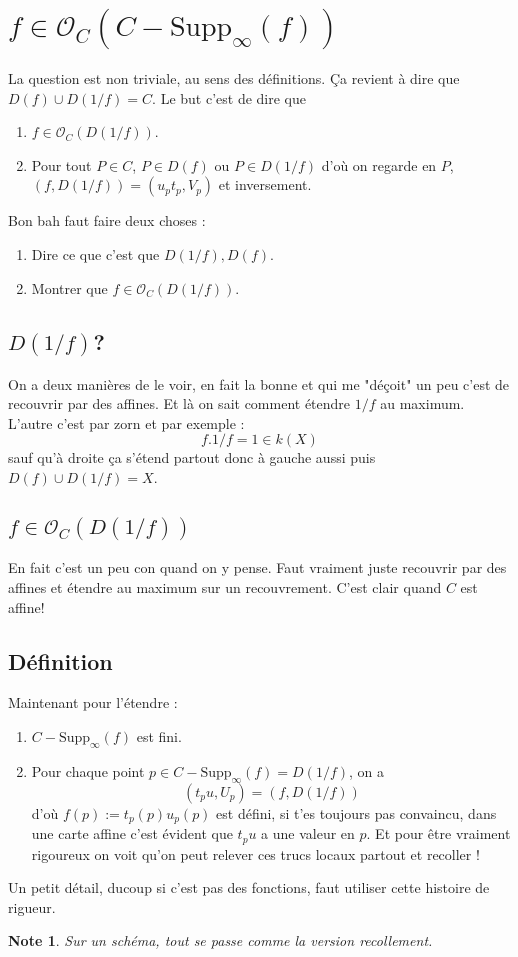 \documentclass[a4paper,12pt]{book}
\newcommand{\Or}{\mathcal{O}}
\newcommand{\Supp}{\textrm{Supp}}
\theoremstyle{plain}
\newtheorem{note}{Note}
\theoremstyle{definition}
\theoremstyle{remark}
\begin{document}
\section{$f\in \Or_C(C-\Supp_\infty(f))$}
La question est non triviale, au sens des définitions. Ça revient
à dire que $D(f)\cup D(1/f)=C$. Le but c'est de dire que 
\begin{enumerate}
  \item $f\in \Or_C(D(1/f))$.
  \item Pour tout $P\in C$, $P\in D(f)$ ou $P\in D(1/f)$ d'où
    on regarde en $P$, $(f,D(1/f))=(u_pt_p,V_p)$ et inversement.
\end{enumerate}
Bon bah faut faire deux choses :
\begin{enumerate}
  \item Dire ce que c'est que $D(1/f),D(f)$.
  \item Montrer que $f\in \Or_C(D(1/f))$.
\end{enumerate}
\subsection{$D(1/f)$?}
On a deux manières de le voir, en fait la bonne et qui me
"déçoit" un peu c'est de recouvrir par des affines. Et là
on sait comment étendre $1/f$ au maximum. L'autre c'est
par zorn et par exemple :
\[f.1/f=1\in k(X)\]
sauf qu'à droite ça s'étend partout donc à gauche aussi puis
$D(f)\cup D(1/f)=X$.

\subsection{$f\in \Or_C(D(1/f))$}
En fait c'est un peu con quand on y pense. Faut vraiment juste
recouvrir par des affines et étendre au maximum sur un 
recouvrement. C'est clair quand $C$ est affine!

\subsection{Définition}
Maintenant pour l'étendre :
\begin{enumerate}
  \item $C-\Supp_\infty(f)$ est fini.
  \item Pour chaque point $p\in C-\Supp_\infty(f)=D(1/f)$, on a 
    \[(t_pu,U_p)=(f,D(1/f))\]
  d'où $f(p):=t_p(p)u_p(p)$ est défini, si t'es toujours pas 
  convaincu, dans une carte affine c'est évident que $t_pu$ a une
  valeur en $p$. Et pour être vraiment rigoureux
  on voit qu'on peut relever ces trucs locaux partout et
  recoller !
\end{enumerate}
Un petit détail, ducoup si c'est pas des fonctions, faut utiliser
cette histoire de rigueur.
\begin{note}
  Sur un schéma, tout se passe comme la version recollement.
\end{note}


\printbibliography
\end{document}
